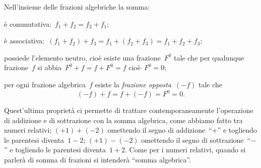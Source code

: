 Nell’insieme delle frazioni algebriche la somma:
\begin{itemize*}
\item è commutativa:~$f_1+ f_2 = f_2 + f_1$;
\item è associativa:~$(f_1+ f_2) + f_3 = f_1 + (f_2 + f_3) = f_1 + f_2 + f_3$;
\item possiede l’elemento neutro, cioè esiste una frazione~$F^0$ tale che per qualunque frazione~$f$ si abbia~$F^{0} + f = f + F^0= f$ cioè~$F^0 = 0$;
\item per ogni frazione algebrica~$f$ esiste la \emph{frazione opposta}~$(-f)$ tale che
\[(-f) + f = f + (- f) = F^0 = 0.\]
\end{itemize*}
Quest’ultima proprietà ci permette di trattare contemporaneamente l’operazione di addizione e di sottrazione con la somma algebrica, come abbiamo fatto
tra numeri relativi; $(+1) + (-2)$ omettendo il segno di addizione~``$+$'' e togliendo le parentesi diventa~$1 - 2$;
$(+1) - (-2)$ omettendo il segno di sottrazione~``$-$'' e togliendo le parentesi diventa~$1 + 2$.
Come per i numeri relativi, quando si parlerà di somma di frazioni si intenderà ``somma algebrica''.
